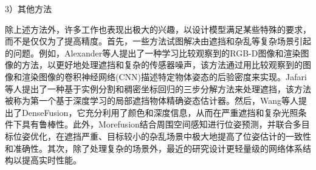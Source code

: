 \documentclass[12pt]{article}
\begin{document}
3）其他方法

除上述方法外，许多工作也表现出极大的兴趣，以设计模型满足某些特殊的要求，而不是仅仅为了提高精度。首先，一些方法试图解决由遮挡和杂乱等复杂场景引起的问题。例如，Alexander等人\cite{krull2015learning58}提出了一种学习比较观察到的RGB-D图像和渲染图像的方法，以更好地处理遮挡和复杂的传感器噪声，该方法通过用比较观察到的图像和渲染图像的卷积神经网络(CNN)描述特定物体姿态的后验密度来实现。Jafari等人\cite{hosseini2019ipose59}提出了一种基于实例分割和稠密坐标回归的三步分解方法来处理遮挡，该方法被称为第一个基于深度学习的局部遮挡物体精确姿态估计器。然后，Wang等人\cite{wang2019densefusion60}提出了DenseFusion，它充分利用了颜色和深度信息，从而在严重遮挡和复杂光照条件下具有鲁棒性。此外，Morefusion\cite{wada2020morefusion61}结合周围空间感知进行位姿预测，并联合多目标位姿优化，在遮挡严重、目标较小的杂乱场景中极大地提高了位姿估计的一致性和准确性。其次，除了处理复杂的场景外，最近的研究设计更轻量级的网络体系结构以提高实时性能。





\end{document}
